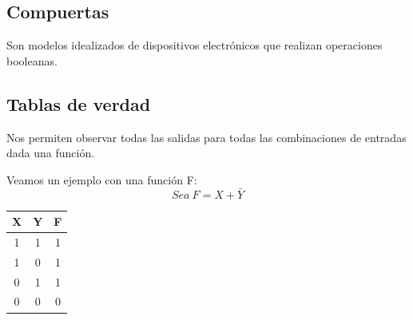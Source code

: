 \documentclass[10pt,a4paper]{article}
\begin{document}
\subsection*{Compuertas}
Son modelos idealizados de dispositivos electrónicos que realizan operaciones booleanas.
\newpage
\subsection*{Tablas de verdad} \label{subsec:TDV}
Nos permiten observar todas las salidas para todas las combinaciones de entradas dada una función. 

Veamos un ejemplo con una función F: 
\[Sea \ F = X + \bar{Y}\]
\begin{table}[h!]
    \centering
    \begin{tabular}{|c | c | c|}
    \hline
    \textbf{X} & \textbf{Y} & \textbf{F}  \\[0.1cm]
    \hline\hline
    1 & 1 & 1 \\
    1 & 0 & 1 \\
    0 & 1 & 1 \\
    0 & 0 & 0 \\
    \hline
    \end{tabular}
    \label{tab:x_y}
\end{table}
\end{document}
